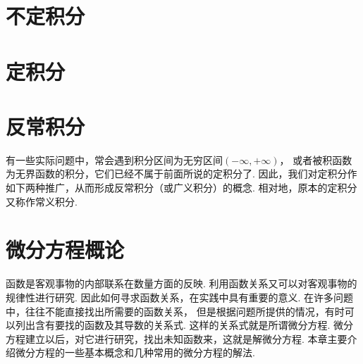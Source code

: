 \chapter{不定积分}\label{chapter:不定积分}






\chapter{定积分}









\chapter{反常积分}
有一些实际问题中，常会遇到积分区间为无穷区间\((-\infty,+\infty)\)，
或者被积函数为无界函数的积分，它们已经不属于前面所说的定积分了.
因此，我们对定积分作如下两种推广，从而形成反常积分（或广义积分）的概念.
相对地，原本的定积分又称作常义积分.









\chapter{微分方程概论}
函数是客观事物的内部联系在数量方面的反映.
利用函数关系又可以对客观事物的规律性进行研究.
因此如何寻求函数关系，在实践中具有重要的意义.
在许多问题中，往往不能直接找出所需要的函数关系，
但是根据问题所提供的情况，有时可以列出含有要找的函数及其导数的关系式.
这样的关系式就是所谓微分方程.
微分方程建立以后，对它进行研究，找出未知函数来，这就是解微分方程.
本章主要介绍微分方程的一些基本概念和几种常用的微分方程的解法.








% 


